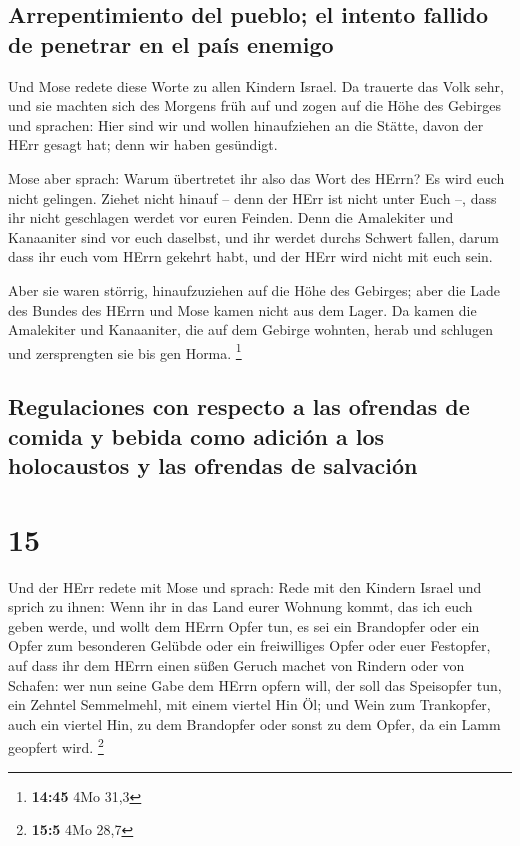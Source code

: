 \hypertarget{arrepentimiento-del-pueblo-el-intento-fallido-de-penetrar-en-el-pauxeds-enemigo}{%
\subsection{Arrepentimiento del pueblo; el intento fallido de penetrar
en el país
enemigo}\label{arrepentimiento-del-pueblo-el-intento-fallido-de-penetrar-en-el-pauxeds-enemigo}}

 Und Mose redete diese Worte zu allen Kindern Israel. Da
trauerte das Volk sehr,  und sie machten sich des Morgens
früh auf und zogen auf die Höhe des Gebirges und sprachen: Hier sind wir
und wollen hinaufziehen an die Stätte, davon der HErr gesagt hat; denn
wir haben gesündigt.

 Mose aber sprach: Warum übertretet ihr also das Wort des
HErrn? Es wird euch nicht gelingen.  Ziehet nicht hinauf
-- denn der HErr ist nicht unter Euch --, dass ihr nicht geschlagen
werdet vor euren Feinden.  Denn die Amalekiter und
Kanaaniter sind vor euch daselbst, und ihr werdet durchs Schwert fallen,
darum dass ihr euch vom HErrn gekehrt habt, und der HErr wird nicht mit
euch sein.

 Aber sie waren störrig, hinaufzuziehen auf die Höhe des
Gebirges; aber die Lade des Bundes des HErrn und Mose kamen nicht aus
dem Lager.  Da kamen die Amalekiter und Kanaaniter, die
auf dem Gebirge wohnten, herab und schlugen und zersprengten sie bis gen
Horma. \footnote{\textbf{14:45} 4Mo 31,3}

\hypertarget{regulaciones-con-respecto-a-las-ofrendas-de-comida-y-bebida-como-adiciuxf3n-a-los-holocaustos-y-las-ofrendas-de-salvaciuxf3n}{%
\subsection{Regulaciones con respecto a las ofrendas de comida y bebida
como adición a los holocaustos y las ofrendas de
salvación}\label{regulaciones-con-respecto-a-las-ofrendas-de-comida-y-bebida-como-adiciuxf3n-a-los-holocaustos-y-las-ofrendas-de-salvaciuxf3n}}

\hypertarget{section-14}{%
\section{15}\label{section-14}}

 Und der HErr redete mit Mose und sprach: 
Rede mit den Kindern Israel und sprich zu ihnen: Wenn ihr in das Land
eurer Wohnung kommt, das ich euch geben werde,  und wollt
dem HErrn Opfer tun, es sei ein Brandopfer oder ein Opfer zum besonderen
Gelübde oder ein freiwilliges Opfer oder euer Festopfer, auf dass ihr
dem HErrn einen süßen Geruch machet von Rindern oder von Schafen:
 wer nun seine Gabe dem HErrn opfern will, der soll das
Speisopfer tun, ein Zehntel Semmelmehl, mit einem viertel Hin Öl;
 und Wein zum Trankopfer, auch ein viertel Hin, zu dem
Brandopfer oder sonst zu dem Opfer, da ein Lamm geopfert wird.
\footnote{\textbf{15:5} 4Mo 28,7}

